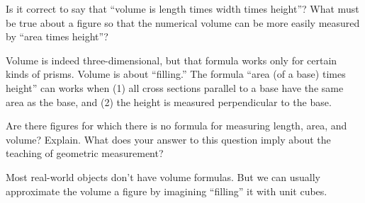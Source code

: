 \documentclass[nooutcomes]{ximera}
\begin{document}
\begin{problem}
 Is it correct to say that ``volume is length times width times height''? What must be true about a figure so that the numerical volume can be more easily measured by ``area times height''?
\begin{freeResponse}
\end{freeResponse}
\begin{hint}
Volume is indeed three-dimensional, but that formula works only for certain kinds of prisms.  Volume is about ``filling.''  The formula ``area (of a base) times height'' can works when (1) all cross sections parallel to a base have the same area as the base, and (2) the height is measured perpendicular to the base.   
\end{hint}
\end{problem}

\begin{problem}
Are there figures for which there is no formula for measuring length, area, and volume?  Explain.  What does your answer to this question imply about the teaching of geometric measurement?
\begin{freeResponse}
\end{freeResponse}
\begin{hint}
Most real-world objects don't have volume formulas.  But we can usually approximate the volume a figure by imagining ``filling'' it with unit cubes.  
\end{hint}
\end{problem}

%
%
\end{document}
